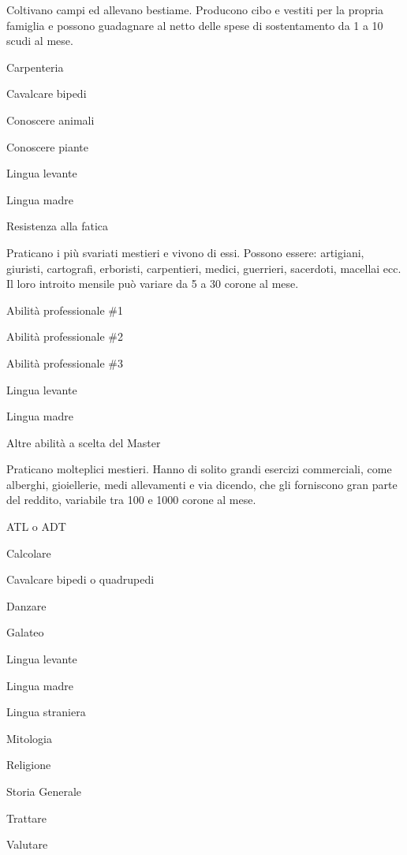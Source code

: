 
Coltivano campi ed allevano bestiame.  Producono cibo e vestiti per la
propria famiglia e possono guadagnare al netto delle spese di
sostentamento da 1 a 10 scudi al mese.

\begin{abilist}
\item Carpenteria
\item Cavalcare bipedi
\item Conoscere animali
\item Conoscere piante
\item Lingua levante
\item Lingua madre
\item Resistenza alla fatica
\end{abilist}


Praticano i pi\`u svariati mestieri e vivono di essi. Possono essere:
artigiani, giuristi, cartografi, erboristi, carpentieri, medici,
guerrieri, sacerdoti, macellai ecc. Il loro introito mensile pu\`o
variare da 5 a 30 corone al mese.

\begin{abilist}
\item Abilit\`a professionale \#1
\item Abilit\`a professionale \#2
\item Abilit\`a professionale \#3
\item Lingua levante
\item Lingua madre
\item Altre abilit\`a a scelta del Master
\end{abilist}

 
Praticano molteplici mestieri. Hanno di solito grandi esercizi
commerciali, come alberghi, gioiellerie, medi allevamenti e via
dicendo, che gli forniscono gran parte del reddito, variabile tra 100
e 1000 corone al mese.



\begin{abilist}
\item ATL o ADT
\item Calcolare
\item Cavalcare bipedi o quadrupedi
\item Danzare
\item Galateo
\item Lingua levante
\item Lingua madre
\item Lingua straniera
\item Mitologia
\item Religione
\item Storia Generale
\item Trattare
\item Valutare
\end{abilist}

